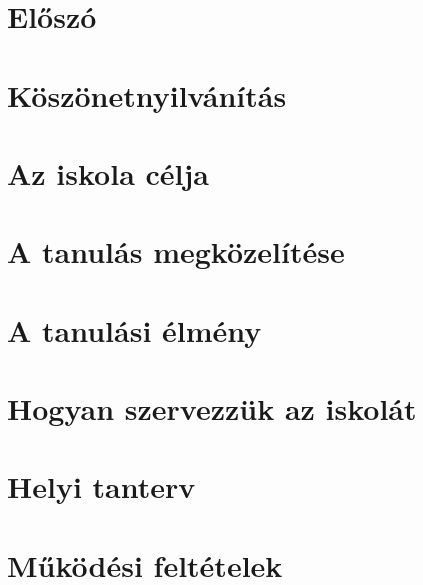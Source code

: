 \documentclass[10pt,openright,twoside]{book}
\begin{document}
\let\apageref\pageref
\let\autocite\citep


\pagestyle{empty}




\tableofcontents
\frontmatter
\chapter{Előszó}

\chapter{Köszönetnyilvánítás} 

\mainmatter
\pagestyle{fancy}
\chapter{Az iskola célja}






\chapter{A tanulás megközelítése}





\chapter{A tanulási élmény}










\chapter{Hogyan szervezzük az iskolát}











\chapter{Helyi tanterv}











% 
\chapter{Működési feltételek}


\backmatter

\end{document}
